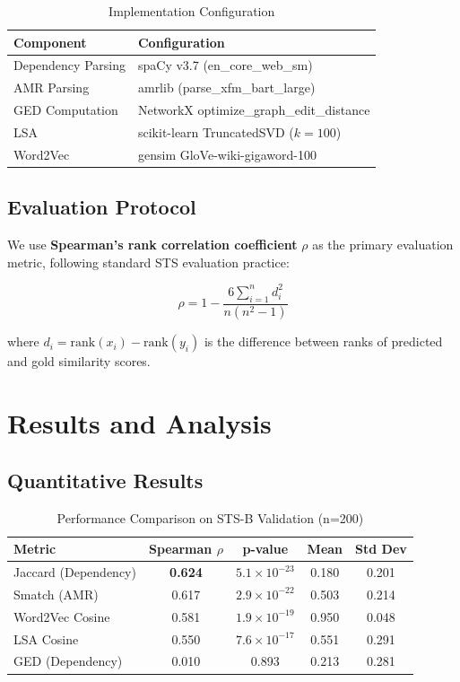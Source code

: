 \documentclass[11pt,a4paper]{article}
\begin{document}
\begin{table}[h]
\centering
\caption{Implementation Configuration}
\begin{tabular}{ll}
\toprule
\textbf{Component} & \textbf{Configuration} \\
\midrule
Dependency Parsing & spaCy v3.7 (en\_core\_web\_sm) \\
AMR Parsing & amrlib (parse\_xfm\_bart\_large) \\
GED Computation & NetworkX optimize\_graph\_edit\_distance \\
LSA & scikit-learn TruncatedSVD ($k=100$) \\
Word2Vec & gensim GloVe-wiki-gigaword-100 \\
\bottomrule
\end{tabular}
\end{table}

\subsection{Evaluation Protocol}

We use \textbf{Spearman's rank correlation coefficient} $\rho$ as the primary evaluation metric, following standard STS evaluation practice:

\begin{equation}
\rho = 1 - \frac{6 \sum_{i=1}^n d_i^2}{n(n^2 - 1)}
\end{equation}

where $d_i = \text{rank}(x_i) - \text{rank}(y_i)$ is the difference between ranks of predicted and gold similarity scores.

\section{Results and Analysis}

\subsection{Quantitative Results}

\begin{table}[h]
\centering
\caption{Performance Comparison on STS-B Validation (n=200)}
\begin{tabular}{lcccc}
\toprule
\textbf{Metric} & \textbf{Spearman $\rho$} & \textbf{p-value} & \textbf{Mean} & \textbf{Std Dev} \\
\midrule
Jaccard (Dependency) & \textbf{0.624} & $5.1 \times 10^{-23}$ & 0.180 & 0.201 \\
Smatch (AMR) & 0.617 & $2.9 \times 10^{-22}$ & 0.503 & 0.214 \\
Word2Vec Cosine & 0.581 & $1.9 \times 10^{-19}$ & 0.950 & 0.048 \\
LSA Cosine & 0.550 & $7.6 \times 10^{-17}$ & 0.551 & 0.291 \\
GED (Dependency) & 0.010 & 0.893 & 0.213 & 0.281 \\
\bottomrule
\end{tabular}
\label{tab:results}
\end{table}
\end{document}
